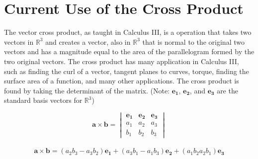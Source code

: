 \documentclass[12]{amsart}
\begin{document}
	\section{Current Use of the Cross Product}
		The vector cross product, as taught in Calculus III, is a operation that takes two vectors in $\mathbb{R}^3$ and creates a vector, also in $\mathbb{R}^3$ that is normal to the original two vectors and has a magnitude equal to the area of the parallelogram formed by the two original vectors. The cross product has many application in Calculus III, such as finding the curl of a vector, tangent planes to curves, torque, finding the surface area of a function, and many other applications. The cross product is found by taking the determinant of the matrix. (Note: $\mathbf{e_1}$, $\mathbf{e_2}$, and $\mathbf{e_3}$ are the standard basis vectors for $\mathbb{R}^3$) 
		
		$$ 
		\mathbf{a} \times \mathbf{b} = 
		\begin{vmatrix} 
			\mathbf{e_1}&\mathbf{e_2}&\mathbf{e_3}\\
			a_1&a_2&a_3\\
			b_1&b_2&b_3
		\end{vmatrix} 
		$$
		\\
		$$
		\mathbf{a} \times \mathbf{b} = (a_2 b_3 - a_3 b_2)\mathbf{e_1} + (a_3 b_1 - a_1 b_3)\mathbf{e_2} + (a_1 b_2 a_2 b_1)\mathbf{e_3}
		$$
	\newpage
\end{document}
